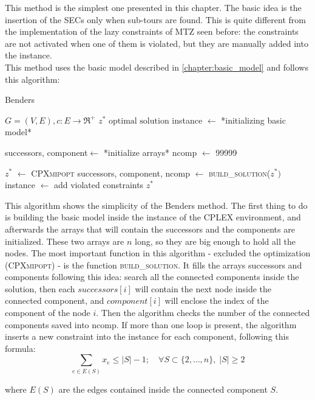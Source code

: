 This method is the simplest one presented in this chapter. The basic idea is the insertion of the SECs only when sub-tours are found. This is quite different from the implementation of the lazy constraints of MTZ seen before: the constraints are not activated when one of them is violated, but they are manually added into the instance.\\
This method uses the basic model described in \ref{chapter:basic_model} and follows this algorithm:

\begin{algorithm}
	\caption{Benders}\label{algo:benders}
	\begin{algorithmic}[1]
		\Require $G=(V,E), c:E\rightarrow \Re^+$
		\Ensure $z^*\text{ optimal solution}$
		\State instance $\gets$ *initializing basic model*
		
		\State successors, component$\gets$ *initialize arrays*
		\State ncomp $\gets$ 99999
		
			\State $z^*$ $\gets$ \textsc{CPXmipopt}
			\State successors, component, ncomp $\gets$ \textsc{build\_solution}($z^*)$
				\State instance $\gets$ add violated constraints
			\EndIf	
		\EndWhile
		\State \Return $z^*$
	\end{algorithmic}
\end{algorithm}

This algorithm shows the simplicity of the Benders method. The first thing to do is building the basic model inside the instance of the CPLEX environment, and afterwards the arrays that will contain the successors and the components are initialized. These two arrays are $n$ long, so they are big enough to hold all the nodes. The most important function in this algorithm - excluded the optimization (\textsc{CPXmipopt}) - is the function \textsc{build\_solution}. It fills the arrays successors and components following this idea: search all the connected components inside the solution, then each $successors[i]$ will contain the next node inside the connected component, and $component[i]$ will enclose the index of the component of the node $i$. Then the algorithm checks the number of the connected components saved into ncomp. If more than one loop is present, the algorithm inserts a new constraint into the instance for each component, following this formula:
\begin{equation}
\sum_{e\in E(S)}x_{e}\le |S|-1; \quad \forall S \subset\{2, \dots, n\}, \; |S|\ge 2
\end{equation}


where $E(S)$ are the edges contained inside the connected component $S$.